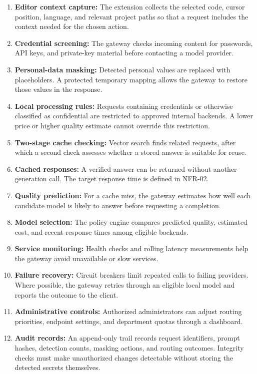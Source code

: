 \begin{enumerate}
    \item \textbf{Editor context capture:} The extension collects the selected code, cursor position, language, and relevant project paths so that a request includes the context needed for the chosen action.
    \item \textbf{Credential screening:} The gateway checks incoming content for passwords, API keys, and private-key material before contacting a model provider.
    \item \textbf{Personal-data masking:} Detected personal values are replaced with placeholders. A protected temporary mapping allows the gateway to restore those values in the response.
    \item \textbf{Local processing rules:} Requests containing credentials or otherwise classified as confidential are restricted to approved internal backends. A lower price or higher quality estimate cannot override this restriction.
    \item \textbf{Two-stage cache checking:} Vector search finds related requests, after which a second check assesses whether a stored answer is suitable for reuse.
    \item \textbf{Cached responses:} A verified answer can be returned without another generation call. The target response time is defined in NFR-02.
    \item \textbf{Quality prediction:} For a cache miss, the gateway estimates how well each candidate model is likely to answer before requesting a completion.
    \item \textbf{Model selection:} The policy engine compares predicted quality, estimated cost, and recent response times among eligible backends.
    \item \textbf{Service monitoring:} Health checks and rolling latency measurements help the gateway avoid unavailable or slow services.
    \item \textbf{Failure recovery:} Circuit breakers limit repeated calls to failing providers. Where possible, the gateway retries through an eligible local model and reports the outcome to the client.
    \item \textbf{Administrative controls:} Authorized administrators can adjust routing priorities, endpoint settings, and department quotas through a dashboard.
    \item \textbf{Audit records:} An append-only trail records request identifiers, prompt hashes, detection counts, masking actions, and routing outcomes. Integrity checks must make unauthorized changes detectable without storing the detected secrets themselves.
\end{enumerate}

